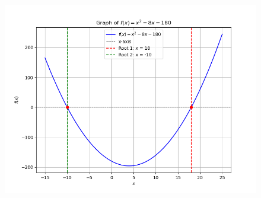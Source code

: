 \documentclass[journal]{IEEEtran}
\begin{document}
\begin{figure}[h!]
   \centering
   \includegraphics[width=0.7\columnwidth]{figs/figure_1.png}
\end{figure}
\end{document}
